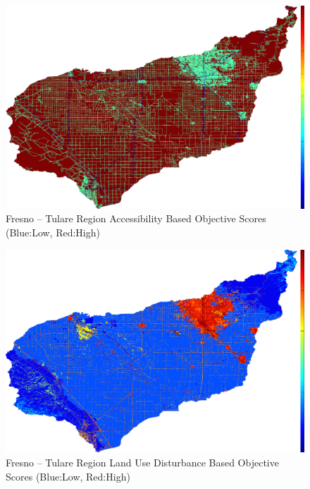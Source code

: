         \begin{figure}[!h]
            \begin{center}
            \includegraphics[width=5.5in]{figures/Fresno_AccessibilityScore.png}   
            \caption{Fresno -- Tulare Region Accessibility Based Objective Scores (Blue:Low, Red:High)}
            \label{fig:Faccessibility}
            \end{center}
        \end{figure}

        \begin{figure}[!h]
            \begin{center}
            \includegraphics[width=5.5in]{figures/Fresno_DisturbanceScore.png}   
            \caption{Fresno -- Tulare Region Land Use Disturbance Based Objective Scores (Blue:Low, Red:High)}
            \label{fig:Fdisturbance}
            \end{center}
        \end{figure}
        
